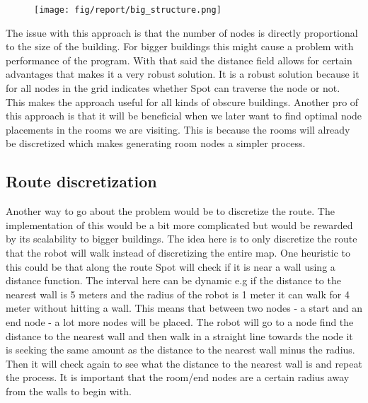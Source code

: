   

\begin{figure}[H]
    \centering
    \texttt{[image: fig/report/big\_structure.png]}
    \label{}
    \caption[Design overview]{}
\end{figure}

The issue with this approach is that the number of nodes is directly proportional to the size of the building. For bigger buildings this might cause a problem with performance of the program. 
With that said the distance field allows for certain advantages that makes it a very robust solution. It is a robust solution because it for all nodes in the grid indicates whether Spot can traverse the node or not. This makes the approach useful for all kinds of obscure buildings.
Another pro of this approach is that it will be beneficial when we later want to find optimal node placements in the rooms we are visiting. This is because the rooms will already be discretized which makes generating room nodes a simpler process.


\subsection{Route discretization}
Another way to go about the problem would be to discretize the route. The implementation of this would be a bit more complicated but would be rewarded by its scalability to bigger buildings. 
The idea here is to only discretize the route that the robot will walk instead of discretizing the entire map. 
One heuristic to this could be that along the route Spot will check if it is near a wall using a distance function. The interval here can be dynamic e.g if the distance to the nearest wall is 5 meters and the radius of the robot is 1 meter it can walk for 4 meter without hitting a wall.
This means that between two nodes - a start and an end node - a lot more nodes will be placed. The robot will go to a node find the distance to the nearest wall and then walk in a straight line towards the node it is seeking the same amount as the distance to the nearest wall minus the radius. Then it will check again to see what the distance to the nearest wall is and repeat the process. It is important that the room/end nodes are a certain radius away from the walls to begin with. 

